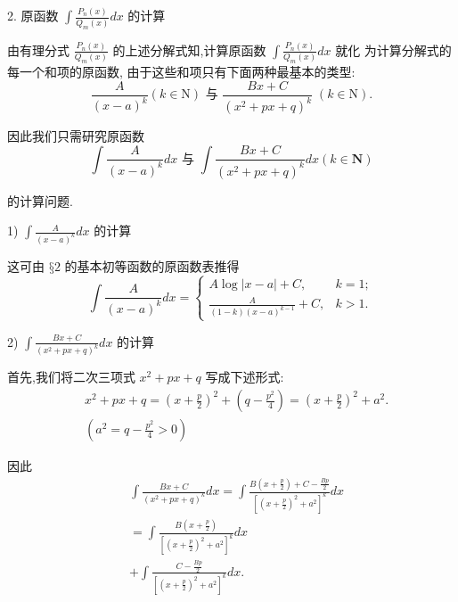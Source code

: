 2. 原函数 $\int \frac{{P}_{n}\left( x\right) }{{Q}_{m}\left( x\right) }{dx}$ 的计算

由有理分式 $\frac{{P}_{n}\left( x\right) }{{Q}_{m}\left( x\right) }$ 的上述分解式知,计算原函数 $\int \frac{{P}_{n}\left( x\right) }{{Q}_{m}\left( x\right) }{dx}$ 就化 为计算分解式的每一个和项的原函数, 由于这些和项只有下面两种最基本的类型:
$$\frac{A}{{\left( x - a\right) }^{k}}\left( {k \in  \mathrm{N}}\right) \text{ 与 }\frac{{Bx} + C}{{\left( {x}^{2} + px + q\right) }^{k}}\;\left( {k \in  \mathrm{N}}\right) .$$

因此我们只需研究原函数
$$\int \frac{A}{{\left( x - a\right) }^{k}}{dx}\text{ 与 }\int \frac{{Bx} + C}{{\left( {x}^{2} + px + q\right) }^{k}}{dx}\left( {k \in  \mathbf{N}}\right)$$

的计算问题.

1) $\int \frac{A}{{\left( x - a\right) }^{k}}{dx}$ 的计算

这可由 $§2$ 的基本初等函数的原函数表推得
$$\int \frac{A}{{\left( x - a\right) }^{k}}{dx} = \left\{  \begin{array}{ll} A\log \left| {x - a}\right|  + C, & k = 1; \\  \frac{A}{\left( {1 - k}\right) {\left( x - a\right) }^{k - 1}} + C, & k > 1. \end{array}\right.$$

2) $\int \frac{{Bx} + C}{{\left( {x}^{2} + px + q\right) }^{k}}{dx}$ 的计算

首先,我们将二次三项式 ${x}^{2} + {px} + q$ 写成下述形式:
\begin{align*}
	&{x}^{2} + {px} + q = {\left( x + \frac{p}{2}\right) }^{2} + \left( {q - \frac{{p}^{2}}{4}}\right)  = {\left( x + \frac{p}{2}\right) }^{2} + {a}^{2}.\\
	&\left( {{a}^{2} = q - \frac{{p}^{2}}{4} > 0}\right)
\end{align*}

因此
\begin{align*}
	&\int \frac{{Bx} + C}{{\left( {x}^{2} + px + q\right) }^{k}}{dx} = \int \frac{B\left( {x + \frac{p}{2}}\right)  + C - \frac{Bp}{2}}{{\left\lbrack  {\left( x + \frac{p}{2}\right) }^{2} + {a}^{2}\right\rbrack  }^{k}}{dx}\\
	&= \int \frac{B\left( {x + \frac{p}{2}}\right) }{{\left\lbrack  {\left( x + \frac{p}{2}\right) }^{2} + {a}^{2}\right\rbrack  }^{k}}{dx}\\
	&+ \int \frac{C - \frac{Bp}{2}}{{\left\lbrack  {\left( x + \frac{p}{2}\right) }^{2} + {a}^{2}\right\rbrack  }^{k}}{dx}.
\end{align*}

